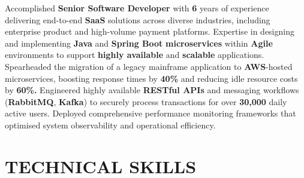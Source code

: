 \documentclass[10pt, letterpaper]{article}
\begin{document}
        Accomplished \textbf{Senior Software Developer} with \textbf{6} years of experience delivering end-to-end \textbf{SaaS} solutions across diverse industries, including enterprise product and high-volume payment platforms. Expertise in designing and implementing \textbf{Java} and \textbf{Spring Boot} \textbf{microservices} within \textbf{Agile} environments to support \textbf{highly available} and \textbf{scalable} applications. Spearheaded the migration of a legacy mainframe application to \textbf{AWS}-hosted microservices, boosting response times by \textbf{40\%} and reducing idle resource costs by \textbf{60\%.} Engineered highly available \textbf{RESTful APIs} and messaging workflows (\textbf{RabbitMQ}, \textbf{Kafka}) to securely process transactions for over \textbf{30,000} daily active users. Deployed comprehensive performance monitoring frameworks that optimised system observability and operational efficiency. 

    \vspace{0.1 cm}
    \section{TECHNICAL SKILLS}
    \vspace{0.1 cm}
\end{document}
